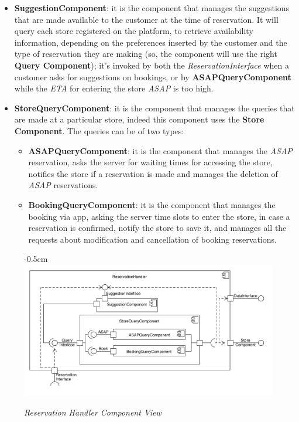 \documentclass{article}
\begin{document}
				\begin{itemize}
					\item {\bfseries SuggestionComponent}: it is the component that manages the suggestions that are made available to the customer at the time of reservation. It will query each store registered on the platform, to retrieve availability information, depending on the preferences inserted by the customer and the type of reservation they are making (so, the component will use the right {\bfseries Query Component}); it’s invoked by both the \emph{ReservationInterface} when a customer asks for suggestions on bookings, or by {\bfseries ASAPQueryComponent} while the \emph{ETA} for entering the store \emph{ASAP} is too high.
					
					\item {\bfseries StoreQueryComponent}: it is the component that manages the queries that are made at a particular store, indeed this component uses the {\bfseries Store Component}. The queries can be of two types:
					
					\begin{itemize}
						\item {\bfseries ASAPQueryComponent}: it is the component that manages the \emph{ASAP} reservation, asks the server for waiting times for accessing the store, notifies the store if a reservation is made and manages the deletion of \emph{ASAP} reservations.
						
						\item {\bfseries BookingQueryComponent}: it is the component that manages the booking via app, asking the server time slots to enter the store, in case a reservation is confirmed, notify the store to save it, and manages all the requests about modification and cancellation of booking reservations.		
					\end{itemize}
				\end{itemize}
				\bigskip
				\begin{figure}[h]
					\begin{adjustwidth} {-0.5cm}{}
						\centering
						\includegraphics[scale=0.5]{Component Diagrams/ReservationHandlerComponentView.pdf}\\
					\end{adjustwidth}
					\caption{\emph{Reservation Handler Component View}}
				\end{figure}
				\newpage
			
\end{document}
